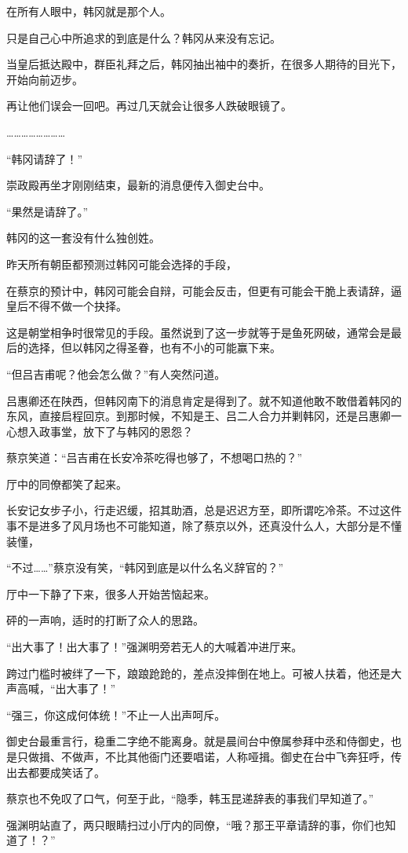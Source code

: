 在所有人眼中，韩冈就是那个人。

只是自己心中所追求的到底是什么？韩冈从来没有忘记。

当皇后抵达殿中，群臣礼拜之后，韩冈抽出袖中的奏折，在很多人期待的目光下，开始向前迈步。

再让他们误会一回吧。再过几天就会让很多人跌破眼镜了。

……………………

“韩冈请辞了！”

崇政殿再坐才刚刚结束，最新的消息便传入御史台中。

“果然是请辞了。”

韩冈的这一套没有什么独创姓。

昨天所有朝臣都预测过韩冈可能会选择的手段，

在蔡京的预计中，韩冈可能会自辩，可能会反击，但更有可能会干脆上表请辞，逼皇后不得不做一个抉择。

这是朝堂相争时很常见的手段。虽然说到了这一步就等于是鱼死网破，通常会是最后的选择，但以韩冈之得圣眷，也有不小的可能赢下来。

“但吕吉甫呢？他会怎么做？”有人突然问道。

吕惠卿还在陕西，但韩冈南下的消息肯定是得到了。就不知道他敢不敢借着韩冈的东风，直接启程回京。到那时候，不知是王、吕二人合力并剿韩冈，还是吕惠卿一心想入政事堂，放下了与韩冈的恩怨？

蔡京笑道：“吕吉甫在长安冷茶吃得也够了，不想喝口热的？”

厅中的同僚都笑了起来。

长安记女步子小，行走迟缓，招其助酒，总是迟迟方至，即所谓吃冷茶。不过这件事不是进多了风月场也不可能知道，除了蔡京以外，还真没什么人，大部分是不懂装懂，

“不过……”蔡京没有笑，“韩冈到底是以什么名义辞官的？”

厅中一下静了下来，很多人开始苦恼起来。

砰的一声响，适时的打断了众人的思路。

“出大事了！出大事了！”强渊明旁若无人的大喊着冲进厅来。

跨过门槛时被绊了一下，踉踉跄跄的，差点没摔倒在地上。可被人扶着，他还是大声高喊，“出大事了！”

“强三，你这成何体统！”不止一人出声呵斥。

御史台最重言行，稳重二字绝不能离身。就是晨间台中僚属参拜中丞和侍御史，也是只做揖、不做声，不比其他衙门还要唱诺，人称哑揖。御史在台中飞奔狂呼，传出去都要成笑话了。

蔡京也不免叹了口气，何至于此，“隐季，韩玉昆递辞表的事我们早知道了。”

强渊明站直了，两只眼睛扫过小厅内的同僚，“哦？那王平章请辞的事，你们也知道了！？”
